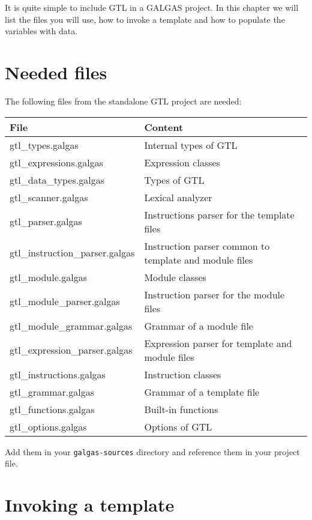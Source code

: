 \documentclass[10pt,openright,twosides,final]{memoir}
\begin{document}
It is quite simple to include GTL in a GALGAS project. In this chapter we will list the files you will use, how to invoke a template and how to populate the variables with data.

\section{Needed files}

The following files from the standalone GTL project are needed:
\begin{longtable}{|>{\ttfamily\footnotesize}l|>{\footnotesize}l|}
\hline
{\bfseries File}&{\bfseries Content}\\
\hline\endhead
 {gtl_types.galgas}&
  {Internal types of GTL}\\
 {gtl_expressions.galgas}&
  {Expression classes}\\
 {gtl_data_types.galgas}&
  {Types of GTL}\\
 {gtl_scanner.galgas}&
  {Lexical analyzer}\\
 {gtl_parser.galgas}&
  {Instructions parser for the template files}\\
 {gtl_instruction_parser.galgas}&
  {Instruction parser common to template and module files}\\
 {gtl_module.galgas}&
  {Module classes}\\
 {gtl_module_parser.galgas}&
  {Instruction parser for the module files}\\
 {gtl_module_grammar.galgas}&
  {Grammar of a module file}\\
 {gtl_expression_parser.galgas}&
  {Expression parser for template and module files}\\
 {gtl_instructions.galgas}&
  {Instruction classes}\\
 {gtl_grammar.galgas}&
  {Grammar of a template file}\\
 {gtl_functions.galgas}&
  {Built-in functions}\\
 {gtl_options.galgas}&
  {Options of GTL}\\
\hline
\end{longtable}

Add them in your \texttt{\footnotesize galgas-sources} directory and reference them in your project file.

\section{Invoking a template}
\end{document}
